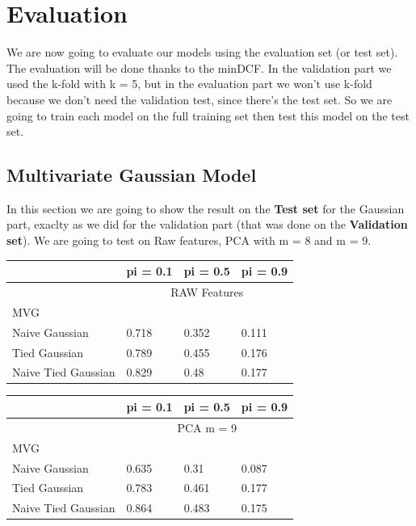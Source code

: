 \documentclass[english]{report}
\begin{document}
\chapter{Evaluation}

We are now going to evaluate our models using the evaluation set (or test set). The evaluation will be done
thanks to the minDCF. In the validation part we used the k-fold with k = 5, but in the evaluation part
we won't use k-fold because we don't need the validation test, since there's the test set. So we are going
to train each model on the full training set then test this model on the test set.

\section{Multivariate Gaussian Model}
In this section we are going to show the result on the \textbf{Test set} for the Gaussian part, 
exaclty as we did for the validation part (that was done on the \textbf{Validation set}). We are going
to test on Raw features, PCA with m = 8 and m = 9.

\begin{table}[H]
    \centering
    \begin{tabular}{@{}llll@{}}
    \toprule
                        & pi = 0.1  & pi = 0.5  & pi = 0.9 \\ \midrule
                        & \multicolumn{3}{c}{RAW Features} \\ \midrule
    MVG                 & \color{red}{0.545}     & \color{red}{0.276}     & \color{red}{0.083}    \\
    Naive Gaussian      & 0.718     & 0.352     & 0.111    \\
    Tied Gaussian       & 0.789     & 0.455     & 0.176    \\
    Naive Tied Gaussian & 0.829     & 0.48     & 0.177    \\ \bottomrule
    \end{tabular}
    \label{tab:MVG_RAW_valid_eval}
\end{table}

\begin{table}[H]
    \centering
    \begin{tabular}{@{}llll@{}}
    \toprule
                        & pi = 0.1  & pi = 0.5  & pi = 0.9 \\ \midrule
                        & \multicolumn{3}{c}{PCA m = 9} \\ \midrule
    MVG                 & \color{red}{0.569}     & \color{red}{0.272}     & \color{red}{0.082}    \\
    Naive Gaussian      & 0.635     & 0.31      & 0.087    \\
    Tied Gaussian       & 0.783     & 0.461     & 0.177    \\
    Naive Tied Gaussian & 0.864     & 0.483     & 0.175    \\ \bottomrule
    \end{tabular}
    \label{tab:MVG_PCA9_valid_eval}
\end{table}
\end{document}

